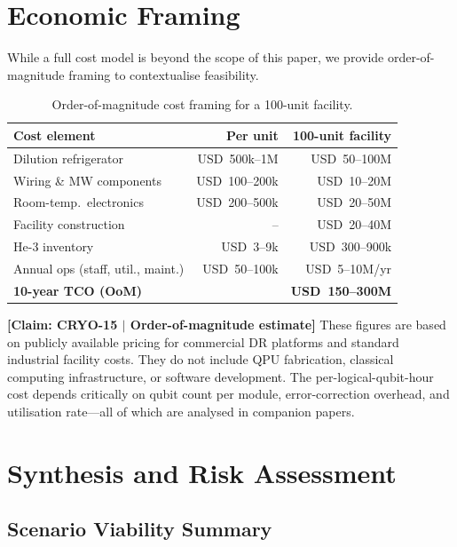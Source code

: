 \documentclass[conference]{IEEEtran}
\begin{document}
\section{Economic Framing}

While a full cost model is beyond the scope of this paper, we provide order-of-magnitude framing to contextualise feasibility.

\begin{table}[H]
\centering
\caption{Order-of-magnitude cost framing for a 100-unit facility.}
\label{tab:cost}
\footnotesize
\begin{tabularx}{\columnwidth}{L{3.0cm}rr}
\toprule
\textbf{Cost element} & \textbf{Per unit} & \textbf{100-unit facility} \\
\midrule
Dilution refrigerator & USD~500k--1M & USD~50--100M \\
Wiring \& MW components & USD~100--200k & USD~10--20M \\
Room-temp.\ electronics & USD~200--500k & USD~20--50M \\
Facility construction & -- & USD~20--40M \\
He-3 inventory & USD~3--9k & USD~300--900k \\
Annual ops (staff, util., maint.) & USD~50--100k & USD~5--10M/yr \\
\midrule
\textbf{10-year TCO (OoM)} & & \textbf{USD~150--300M} \\
\bottomrule
\end{tabularx}
\end{table}

\textbf{[Claim: CRYO-15 $|$ Order-of-magnitude estimate]} These figures are based on publicly available pricing for commercial DR platforms and standard industrial facility costs. They do not include QPU fabrication, classical computing infrastructure, or software development. The per-logical-qubit-hour cost depends critically on qubit count per module, error-correction overhead, and utilisation rate---all of which are analysed in companion papers.

\section{Synthesis and Risk Assessment}

\subsection{Scenario Viability Summary}
\end{document}
